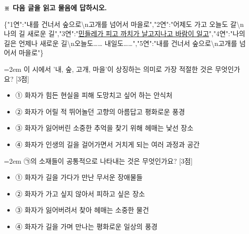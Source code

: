 \documentclass[12pt,a4paper]{article}
\newcommand{\qnum}[1]{%
  \tikz[baseline=(num.base)]{%
    \node[circle, fill=numCircle, text=white, inner sep=0pt,
          minimum size=18pt, font=\small\bfseries] (num) {#1};%
  }%
}
\newcommand{\pts}[1]{%
  \hfill\textcolor{ptsBadge}{[#1점]}%
}
\begin{document}
\vspace{4mm}
{\small\textbf{※ 다음 글을 읽고 물음에 답하시오.}}
\vspace{2mm}
\begin{tcolorbox}[passage]
\{"1연":"내를 건너서 숲으로\textbackslash{}n고개를 넘어서 마을로","2연":"어제도 가고 오늘도 갈\textbackslash{}n나의 길 새로운 길","3연":"\uline{민들레가 피고 까치가 날고 지나고 바람이 일고}","4연":"나의 길은 언제나 새로운 길\textbackslash{}n오늘도…… 내일도……","5연":"내를 건너서 숲으로\textbackslash{}n고개를 넘어서 마을로"\}
\end{tcolorbox}
\vspace{3mm}
\begin{minipage}{\columnwidth}
{\hangindent=2em
\qnum{6}\enspace 이 시에서 '내, 숲, 고개, 마을'이 상징하는 의미로 가장 적절한 것은 무엇인가요? \pts{3}
\par}

\vspace{3mm}
\begin{itemize}[leftmargin=2.5em, labelsep=0.3em, label={}, itemsep=4pt, parsep=1pt, topsep=0pt]
  \item ① 화자가 힘든 현실을 피해 도망치고 싶어 하는 안식처
  \item ② 화자가 어릴 적 뛰어놀던 고향의 아름답고 평화로운 풍경
  \item ③ 화자가 잃어버린 소중한 추억을 찾기 위해 헤매는 낯선 장소
  \item ④ 화자가 인생의 길을 걸어가면서 거치게 되는 여러 과정과 공간
\end{itemize}
\end{minipage}
\vspace{4mm}

\vspace{4mm}
\begin{minipage}{\columnwidth}
{\hangindent=2em
\qnum{7}\enspace ㉠의 소재들이 공통적으로 나타내는 것은 무엇인가요? \pts{3}
\par}

\vspace{3mm}
\begin{itemize}[leftmargin=2.5em, labelsep=0.3em, label={}, itemsep=4pt, parsep=1pt, topsep=0pt]
  \item ① 화자가 길을 가다가 만난 무서운 장애물들
  \item ② 화자가 가고 싶지 않아서 피하고 싶은 장소
  \item ③ 화자가 잃어버려서 찾아 헤매는 소중한 물건
  \item ④ 화자가 길을 가며 만나는 평화로운 일상의 풍경
\end{itemize}
\end{minipage}
\vspace{4mm}
\end{document}
